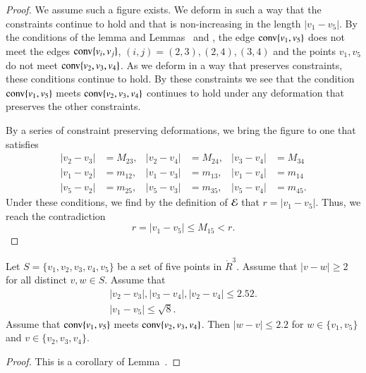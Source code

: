 

\begin{proof}
We assume such a figure exists.  We deform in such a way that the constraints continue
to hold and that is non-increasing in the length $|v_1-v_5|$.  By the conditions of the
lemma and Lemmas~ and , 
the edge ${\operatorname{conv}}\{v_1,v_5\}$
does not meet the
 edges ${\operatorname{conv}}\{v_i,v_j\}$, $(i,j)=(2,3),(2,4),(3,4)$ 
and the points $v_1,v_5$
do not meet ${\operatorname{conv}}\{v_2,v_3,v_4\}$.  As we deform in a way that preserves constraints,
these conditions continue to hold.  By these constraints we see that the condition
  ${\operatorname{conv}}\{v_1,v_5\}$ meets ${\operatorname{conv}}\{v_2,v_3,v_4\}$
continues to hold under any deformation that preserves the other constraints.

By a series of constraint preserving deformations, we bring the figure to one that satisfies
	$$
	\begin{array}{rlrlrl}
	|v_2-v_3|&=M_{23}, &|v_2-v_4| &= M_{24}, &|v_3-v_4| &= M_{34}\\
	|v_1-v_2|&=m_{12}, &|v_1-v_3| &= m_{13}, &|v_1-v_4| &= m_{14}\\
	|v_5-v_2|&=m_{25}, &|v_5-v_3| &= m_{35}, &|v_5-v_4| &= m_{45}.
	\end{array}
	$$
Under these conditions, we find by the definition of ${\mathcal E}$ 
that $r = |v_1-v_5|$.  Thus, we reach the contradiction
	$$
	r = |v_1-v_5| \le M_{15} < r.
	$$
\end{proof}

\newpage

\begin{lemma} 
Let $S=\{v_1,v_2,v_3,v_4,v_5\}$ be a set of five points in $\ring{R}^3$.
Assume that $|v-w|\ge 2$ for all distinct $v,w\in S$.
Assume that
	$$
	\begin{array}{lll}
	|v_2-v_3|, |v_3-v_4|, |v_2-v_4|\le 2.52.\\
	|v_1-v_5|\le \sqrt8.
	\end{array}
	$$
Assume that ${\operatorname{conv}}\{v_1,v_5\}$ meets ${\operatorname{conv}}\{v_2,v_3,v_4\}$.
Then $|w-v|\le 2.2$ for $w\in\{v_1,v_5\}$ and $v\in\{v_2,v_3,v_4\}$.
\end{lemma}

\begin{proof}
This is a corollary of Lemma~.
\end{proof}

